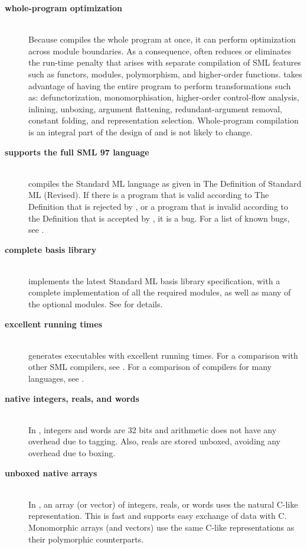 %
\newcommand{\feature}[1]{\item[\bf #1]\hspace{1in}\\}
%
\begin{description}
\feature{whole-program optimization}
Because {\mlton} compiles the whole program at once, it can perform
optimization across module boundaries.  As a consequence, {\mlton}
often reduces or eliminates the run-time penalty that arises with
separate compilation of SML features such as functors, modules,
polymorphism, and higher-order functions.  {\mlton} takes advantage of
having the entire program to perform transformations such as:
defunctorization, monomorphisation, higher-order control-flow
analysis, inlining, unboxing, argument flattening, redundant-argument
removal, constant folding, and representation selection.
Whole-program compilation is an integral part of the design of
{\mlton} and is not likely to change.

\feature{supports the full SML 97 language}
{\mlton} compiles the Standard ML language as given in The Definition
of Standard ML (Revised)\cite{MTHM97}.  If there is a program that is
valid according to The Definition that is rejected by {\mlton}, or a
program that is invalid according to the Definition that is accepted
by {\mlton}, it is a bug.  For a list of known bugs, see
.

\feature{complete basis library}
{\mlton} implements the latest Standard ML basis library
specification, with a complete implementation of all the required
modules, as well as many of the optional modules.  See
 for details.

\feature{excellent running times}
{\mlton} generates executables with excellent running times.
For a comparison with other SML compilers, see
.
For a comparison of compilers for many languages, see
.

\feature{native integers, reals, and words}
In {\mlton}, integers and words are 32 bits and arithmetic does not have
any overhead due to tagging.  Also, reals are stored unboxed, avoiding
any overhead due to boxing.

\feature{unboxed native arrays}
In {\mlton}, an array (or vector) of integers, reals, or words uses
the natural C-like representation.  This is fast and supports easy
exchange of data with C.  Monomorphic arrays (and vectors) use the
same C-like representations as their polymorphic counterparts.


\end{description}
